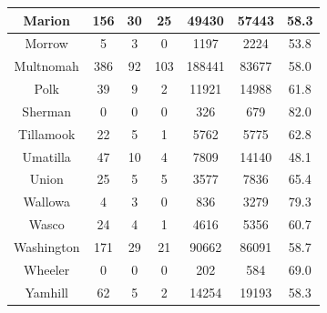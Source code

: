 \documentclass[
  english,
  man]{apa6}
\begin{document}
\begin{table}
\begin{tabular}[t]{c|c|c|c|c|c|c}
\hline
Marion & 156 & 30 & 25 & 49430 & 57443 & 58.3\\
\hline
Morrow & 5 & 3 & 0 & 1197 & 2224 & 53.8\\
\hline
Multnomah & 386 & 92 & 103 & 188441 & 83677 & 58.0\\
\hline
Polk & 39 & 9 & 2 & 11921 & 14988 & 61.8\\
\hline
Sherman & 0 & 0 & 0 & 326 & 679 & 82.0\\
\hline
Tillamook & 22 & 5 & 1 & 5762 & 5775 & 62.8\\
\hline
Umatilla & 47 & 10 & 4 & 7809 & 14140 & 48.1\\
\hline
Union & 25 & 5 & 5 & 3577 & 7836 & 65.4\\
\hline
Wallowa & 4 & 3 & 0 & 836 & 3279 & 79.3\\
\hline
Wasco & 24 & 4 & 1 & 4616 & 5356 & 60.7\\
\hline
Washington & 171 & 29 & 21 & 90662 & 86091 & 58.7\\
\hline
Wheeler & 0 & 0 & 0 & 202 & 584 & 69.0\\
\hline
Yamhill & 62 & 5 & 2 & 14254 & 19193 & 58.3\\
\hline
\end{tabular}
\end{table}
\end{document}
